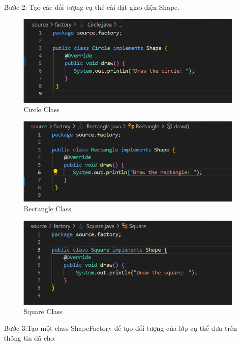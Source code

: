 \newpage
Bước 2: Tạo các đối tượng cụ thể cài đặt giao diện Shape.
\begin{figure}[!htb]
    \centering
    \includegraphics[width=\textwidth]{fig/Factory/circle_class.png}
    \caption{Circle Class}
    \label{fig:circle_class}
\end{figure}

\begin{figure}[!htb]
    \centering
    \includegraphics[width=\textwidth]{fig/Factory/rectangle_class.png}
    \caption{Rectangle Class}
    \label{fig:rectangle_class}
\end{figure}

\begin{figure}[!htb]
    \centering
    \includegraphics[width=\textwidth]{fig/Factory/square_class.png}
    \caption{Square Class}
    \label{fig:square_class}
\end{figure}

\newpage
Bước 3:Tạo một class ShapeFactory để tạo đối tượng của lớp cụ thể dựa trên thông tin đã cho.

